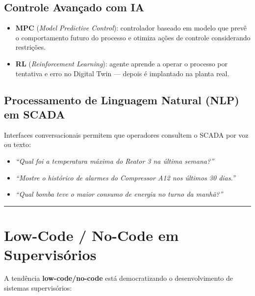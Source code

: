 \subsection{Controle Avançado com IA}\label{controle-avanuxe7ado-com-ia}

\begin{itemize}
\tightlist
\item
  \textbf{MPC} (\emph{Model Predictive Control}): controlador baseado em modelo que prevê o comportamento futuro do processo e otimiza ações de controle considerando restrições.
\item
  \textbf{RL} (\emph{Reinforcement Learning}): agente aprende a operar o processo por tentativa e erro no Digital Twin --- depois é implantado na planta real.
\end{itemize}

\subsection{Processamento de Linguagem Natural (NLP) em SCADA}\label{processamento-de-linguagem-natural-nlp-em-scada}

Interfaces conversacionais permitem que operadores consultem o SCADA por voz ou texto:

\begin{itemize}
\tightlist
\item
  \emph{``Qual foi a temperatura máxima do Reator 3 na última semana?''}
\item
  \emph{``Mostre o histórico de alarmes do Compressor A12 nos últimos 30 dias.''}
\item
  \emph{``Qual bomba teve o maior consumo de energia no turno da manhã?''}
\end{itemize}

\begin{center}\rule{0.5\linewidth}{0.5pt}\end{center}

\section{Low-Code / No-Code em Supervisórios}\label{low-code-no-code-em-supervisuxf3rios}

A tendência \textbf{low-code/no-code} está democratizando o desenvolvimento de sistemas supervisórios:


